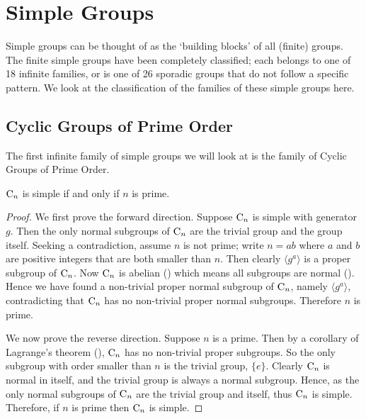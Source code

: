 \chapter{Simple Groups}
Simple groups can be thought of as the `building blocks' of all (finite) groups. The finite simple groups have been completely classified; each belongs to one of 18 infinite families, or is one of 26 sporadic groups that do not follow a specific pattern. We look at the classification of the families of these simple groups here.

\section{Cyclic Groups of Prime Order}
The first infinite family of simple groups we will look at is the family of Cyclic Groups of Prime Order.

\begin{lemma}\label{lemma-cyclic-group-simple-iff-order-is-prime}
    $\mathrm{C}_{n}$ is simple if and only if $n$ is prime.
\end{lemma}
\begin{proof}
    We first prove the forward direction. Suppose $\mathrm{C}_{n}$ is simple with generator $g$. Then the only normal subgroups of $\mathrm{C}_{n}$ are the trivial group and the group itself. Seeking a contradiction, assume $n$ is not prime; write $n = ab$ where $a$ and $b$ are positive integers that are both smaller than $n$. Then clearly $\langle g^a\rangle$ is a proper subgroup of $\mathrm{C}_{n}$. Now $\mathrm{C}_{n}$ is abelian () which means all subgroups are normal (). Hence we have found a non-trivial proper normal subgroup of $\mathrm{C}_{n}$, namely $\langle g^a \rangle$, contradicting that $\mathrm{C}_{n}$ has no non-trivial proper normal subgroups. Therefore $n$ is prime.

    We now prove the reverse direction. Suppose $n$ is a prime. Then by a corollary of Lagrange's theorem (), $\mathrm{C}_{n}$ has no non-trivial proper subgroups. So the only subgroup with order smaller than $n$ is the trivial group, $\{e\}$. Clearly $\mathrm{C}_{n}$ is normal in itself, and the trivial group is always a normal subgroup. Hence, as the only normal subgroups of $\mathrm{C}_{n}$ are the trivial group and itself, thus $\mathrm{C}_{n}$ is simple. Therefore, if $n$ is prime then $\mathrm{C}_{n}$ is simple.
\end{proof}

